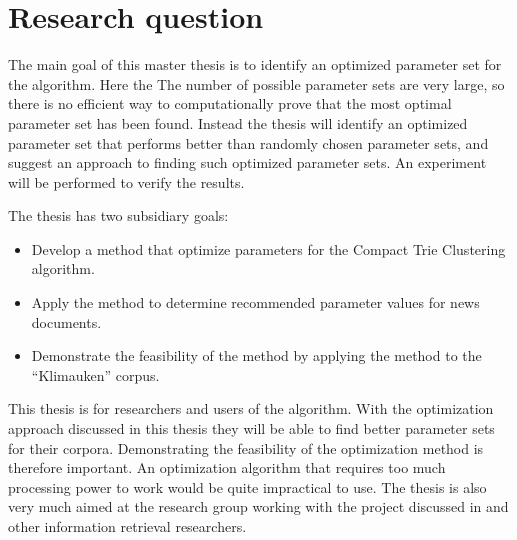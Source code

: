 

\section{Research question}

The main goal of this master thesis is to identify an optimized parameter set for the \CTC algorithm. Here the  The number of possible parameter sets are very large, so there is no efficient way to computationally prove that the most optimal parameter set has been found. Instead the thesis will identify an optimized parameter set that performs better than randomly chosen parameter sets, and suggest an approach to finding such optimized parameter sets. An experiment will be performed to verify the results.

The thesis has two subsidiary goals:
\begin{itemize}
	\item Develop a method that optimize parameters for the Compact Trie Clustering algorithm.
	\item Apply the method to determine recommended parameter values for news documents.
	\item Demonstrate the feasibility of the method by applying the method to the ``Klimauken'' corpus.
\end{itemize}

This thesis is for researchers and users of the \STC algorithm. With the optimization approach discussed in this thesis they will be able to find better parameter sets for their corpora. Demonstrating the feasibility of the optimization method is therefore important. An optimization algorithm that requires too much processing power to work would be quite impractical to use. The thesis is also very much aimed at the research group working with the project discussed in  and other information retrieval researchers.

